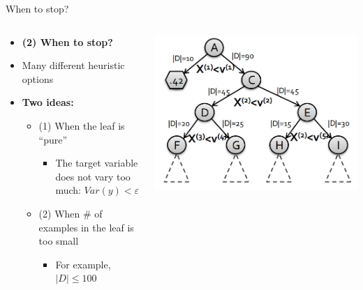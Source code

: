\begin{frame}[allowframebreaks]{When to stop?}
    \begin{columns}
        \begin{column}{0.6\textwidth}
            \begin{itemize}
                \item \textbf{(2) When to stop?}
                \item Many different heuristic options
                \item \textbf{Two ideas:}
                \begin{itemize}
                    \item (1) When the leaf is ``pure''
                    \begin{itemize}
                        \item The target variable does not vary too much: $Var(y) < \varepsilon$
                    \end{itemize}
                    \item (2) When \# of examples in the leaf is too small
                    \begin{itemize}
                        \item For example, $|D| \leq 100$
                    \end{itemize}
                \end{itemize}
            \end{itemize}
        \end{column}
        \begin{column}{0.4\textwidth}
            \includegraphics[width=\linewidth]{images/decision-trees/decision-trees-12.png}
        \end{column}
    \end{columns}
\end{frame}


